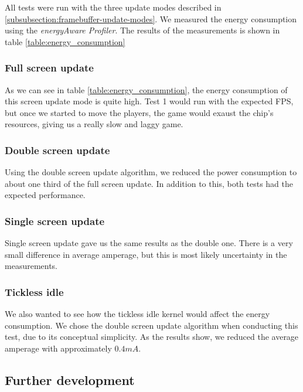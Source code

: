 All tests were run with the three update modes described in \ref{subsubsection:framebuffer-update-modes}. We measured the energy consumption using the \emph{energyAware Profiler}. The results of the measurements is shown in table \ref{table:energy_consumption}



\subsubsection{Full screen update}
As we can see in table \ref{table:energy_consumption}, the energy consumption of this screen update mode is quite high. Test 1 would run with the expected FPS, but once we started to move the players, the game would exaust the chip's resources, giving us a really slow and laggy game.

\subsubsection{Double screen update}
Using the double screen update algorithm, we reduced the power consumption to about one third of the full screen update. In addition to this, both tests had the expected performance.

\subsubsection{Single screen update}
Single screen update gave us the same results as the double one. There is a very small difference in average amperage, but this is most likely uncertainty in the measurements.

\subsubsection{Tickless idle}
We also wanted to see how the tickless idle kernel would affect the energy consumption. We chose the double screen update algorithm when conducting this test, due to its conceptual simplicity. As the results show, we reduced the average amperage with approximately $0.4mA$.

\subsection{Further development}

